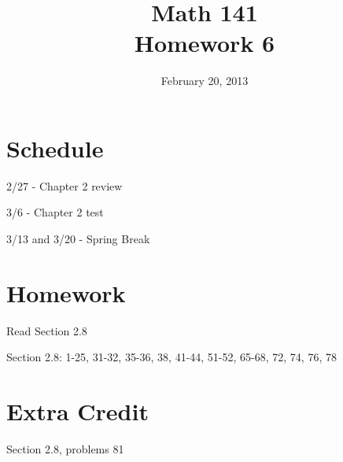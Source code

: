 \documentclass{exam}
\date{February 20, 2013}
\author{}
\title{Math 141 \\ Homework 6}
\begin{document}
\maketitle

\section{Schedule}
\begin{description*}
  \item[2/27] - Chapter 2 review
  \item[3/6] - Chapter 2 test
  \item[3/13 and 3/20] - Spring Break
\end{description*}

\section{Homework}

\begin{itemize*}
  \item Read Section 2.8
  \item Section 2.8: 1-25, 31-32, 35-36, 38, 41-44, 51-52, 65-68, 72, 74, 76, 78
\end{itemize*}

\section{Extra Credit}
Section 2.8, problems 81 
\end{document}
